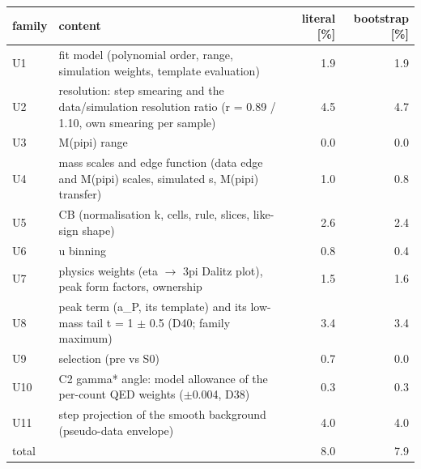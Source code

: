 \begin{tabular}{llrr}
\hline
 family & content & literal [\%] & bootstrap [\%] \\
\hline
 U1 & fit model (polynomial order, range, simulation weights, template evaluation) & 1.9 & 1.9 \\
 U2 & resolution: step smearing and the data/simulation resolution ratio (r = 0.89 / 1.10, own smearing per sample) & 4.5 & 4.7 \\
 U3 & M(pipi) range & 0.0 & 0.0 \\
 U4 & mass scales and edge function (data edge and M(pipi) scales, simulated s, M(pipi) transfer) & 1.0 & 0.8 \\
 U5 & CB (normalisation k, cells, rule, slices, like-sign shape) & 2.6 & 2.4 \\
 U6 & u binning & 0.8 & 0.4 \\
 U7 & physics weights (eta $\to$ 3pi Dalitz plot), peak form factors, ownership & 1.5 & 1.6 \\
 U8 & peak term (a\_P, its template) and its low-mass tail t = 1 $\pm$ 0.5 (D40; family maximum) & 3.4 & 3.4 \\
 U9 & selection (pre vs S0) & 0.7 & 0.0 \\
 U10 & C2 gamma* angle: model allowance of the per-count QED weights ($\pm$0.004, D38) & 0.3 & 0.3 \\
 U11 & step projection of the smooth background (pseudo-data envelope) & 4.0 & 4.0 \\
\hline
 total & & 8.0 & 7.9 \\
\hline
\end{tabular}

